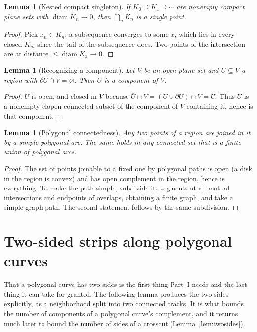 \documentclass[11pt,a4paper]{article}
\theoremstyle{jsplain}
\newtheorem{lemma}[theorem]{Lemma}
\theoremstyle{jsdefn}
\newcommand{\diam}{\operatorname{diam}}
\begin{document}
\begin{lemma}[Nested compact singleton]\label{lem:nested}
If $K_0\supseteq K_1\supseteq\cdots$ are nonempty compact plane sets
with $\diam K_n\to0$, then $\bigcap_nK_n$ is a single point.
\end{lemma}
\begin{proof}
Pick $x_n\in K_n$; a subsequence converges to some $x$, which lies in
every closed $K_m$ since the tail of the subsequence does. Two points
of the intersection are at distance $\le\diam K_n\to0$.
\end{proof}

\begin{lemma}[Recognizing a component]\label{lem:clopen}
Let $V$ be an open plane set and $U\subseteq V$ a region with
$\partial U\cap V=\varnothing$. Then $U$ is a component of $V$.
\end{lemma}
\begin{proof}
$U$ is open, and closed in $V$ because
$\overline U\cap V=(U\cup\partial U)\cap V=U$. Thus $U$ is a nonempty
clopen connected subset of the component of $V$ containing it, hence is
that component.
\end{proof}

\begin{lemma}[Polygonal connectedness]\label{lem:polyconn}
Any two points of a region are joined in it by a simple polygonal arc.
The same holds in any connected set that is a finite union of
polygonal arcs.
\end{lemma}
\begin{proof}
The set of points joinable to a fixed one by polygonal paths is open
(a disk in the region is convex) and has open complement in the
region, hence is everything. To make the path simple, subdivide its
segments at all mutual intersections and endpoints of overlaps,
obtaining a finite graph, and take a simple graph path. The second
statement follows by the same subdivision.
\end{proof}

\section{Two-sided strips along polygonal curves}\label{sec:strips}

That a polygonal curve has two sides is the first thing Part~I needs and
the last thing it can take for granted. The following lemma produces the
two sides explicitly, as a neighborhood split into two connected tracks.
It is what bounds the number of components of a polygonal curve's
complement, and it returns much later to bound the number of sides of a
crosscut (Lemma~\ref{lem:twosides}).
\end{document}
